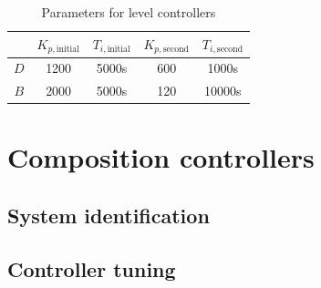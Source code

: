 \documentclass[12pt]{article}
\begin{document}
\begin{table}[h]
\centering
\begin{tabular}{c | c | c | c | c}
 & $K_{p, \textrm{initial}}$ & $T_{i, \textrm{initial}}$ & $K_{p, \textrm{second}}$ & $T_{i, \textrm{second}}$\\ \hline
 $D$ & 1200 & 5000s & 600 & 1000s \\
 $B$ & 2000 & 5000s & 120 & 10000s
\end{tabular}
\caption{Parameters for level controllers}
\end{table}

\newpage
\section{Composition controllers}
\subsection{System identification}
\subsection{Controller tuning}
\end{document}
